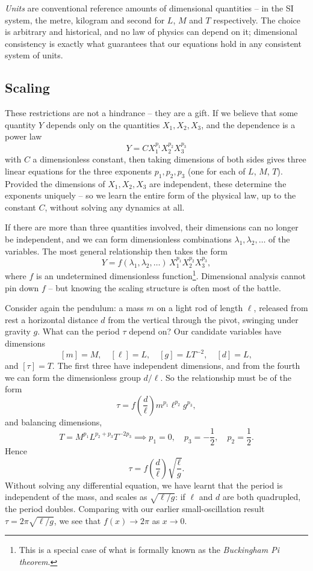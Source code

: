 \emph{Units} are conventional reference amounts of dimensional quantities -- in the SI system, the metre, kilogram and second for $L$, $M$ and $T$ respectively. The choice is arbitrary and historical, and no law of physics can depend on it; dimensional consistency is exactly what guarantees that our equations hold in any consistent system of units.

\subsection{Scaling}

These restrictions are not a hindrance -- they are a gift. If we believe that some quantity $Y$ depends only on the quantities $X_1, X_2, X_3$, and the dependence is a power law
$$
Y = C X_1^{p_1} X_2^{p_2} X_3^{p_3}
$$
with $C$ a dimensionless constant, then taking dimensions of both sides gives three linear equations for the three exponents $p_1, p_2, p_3$ (one for each of $L$, $M$, $T$). Provided the dimensions of $X_1, X_2, X_3$ are independent, these determine the exponents uniquely -- so we learn the entire form of the physical law, up to the constant $C$, without solving any dynamics at all.

If there are more than three quantities involved, their dimensions can no longer be independent, and we can form dimensionless combinations $\lambda_1, \lambda_2, \dots$ of the variables. The most general relationship then takes the form
$$
Y = f(\lambda_1, \lambda_2, \dots)\, X_1^{p_1} X_2^{p_2} X_3^{p_3},
$$
where $f$ is an undetermined dimensionless function\footnote{This is a special case of what is formally known as the \emph{Buckingham Pi theorem}.}. Dimensional analysis cannot pin down $f$ -- but knowing the scaling structure is often most of the battle.

\begin{example}
	Consider again the pendulum: a mass $m$ on a light rod of length $\ell$, released from rest a horizontal distance $d$ from the vertical through the pivot, swinging under gravity $g$. What can the period $\tau$ depend on? Our candidate variables have dimensions
	$$
	[m] = M, \quad [\ell] = L, \quad [g] = LT^{-2}, \quad [d] = L,
	$$
	and $[\tau] = T$. The first three have independent dimensions, and from the fourth we can form the dimensionless group $d/\ell$. So the relationship must be of the form
	$$
	\tau = f\left(\frac{d}{\ell}\right) m^{p_1} \ell^{p_2} g^{p_3},
	$$
	and balancing dimensions,
	$$
	T = M^{p_1} L^{p_2 + p_3} T^{-2p_3} \implies p_1 = 0, \quad p_3 = -\frac{1}{2}, \quad p_2 = \frac{1}{2}.
	$$
	Hence
	$$
	\tau = f\left(\frac{d}{\ell}\right)\sqrt{\frac{\ell}{g}}.
	$$
	Without solving any differential equation, we have learnt that the period is independent of the mass, and scales as $\sqrt{\ell/g}$: if $\ell$ and $d$ are both quadrupled, the period doubles. Comparing with our earlier small-oscillation result $\tau = 2\pi\sqrt{\ell/g}$, we see that $f(x) \to 2\pi$ as $x \to 0$.
\end{example}

